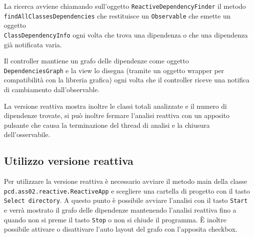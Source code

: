 \documentclass[11pt,notitlepage]{article}
\begin{document}
La ricerca avviene chiamando sull'oggetto \texttt{ReactiveDependencyFinder} il metodo \\
\texttt{findAllClassesDependencies} che restituisce un \texttt{Observable} che emette un oggetto \\
\texttt{ClassDependencyInfo} ogni volta che trova una dipendenza o che una dipendenza già notificata varia.

Il controller mantiene un grafo delle dipendenze come oggetto \texttt{DependenciesGraph} e la view lo disegna (tramite un oggetto wrapper per compatibilità con la libreria grafica)
ogni volta che il controller riceve una notifica di cambiamento dall'observable.

La versione reattiva mostra inoltre le classi totali analizzate e il numero di dipendenze trovate, si può inoltre fermare l'analisi reattiva con un apposito pulsante che causa la
terminazione del thread di analisi e la chiusura dell'osservabile.

\subsection{Utilizzo versione reattiva}

Per utilizzare la versione reattiva è necessario avviare il metodo main della classe \texttt{pcd.ass02.reactive.ReactiveApp} e scegliere una cartella di progetto con il tasto 
\texttt{Select directory}.
A questo punto è possibile avviare l'analisi con il tasto \texttt{Start} e verrà mostrato il grafo delle dipendenze mantenendo l'analisi reattiva fino a quando non si preme 
il tasto \texttt{Stop} o non si chiude il programma.
È inoltre possibile attivare o disattivare l'auto layout del grafo con l'apposita checkbox.
\end{document}

